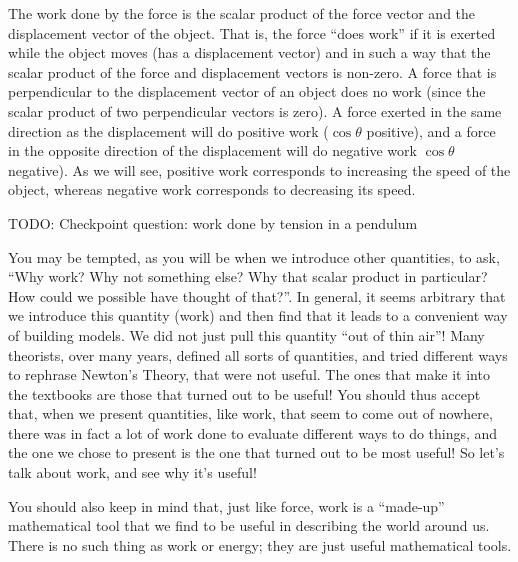 The work done by the force is the scalar product of the force vector and the displacement vector of the object. That is, the force ``does work'' if it is exerted while the object moves (has a displacement vector) and in such a way that the scalar product of the force and displacement vectors is non-zero. A force that is perpendicular to the displacement vector of an object does no work (since the scalar product of two perpendicular vectors is zero).  A force exerted in the same direction as the displacement will do positive work ($\cos\theta$ positive), and a force in the opposite direction of the displacement will do negative work $\cos\theta$ negative). As we will see, positive work corresponds to increasing the speed of the object, whereas negative work corresponds to decreasing its speed.

TODO: Checkpoint question: work done by tension in a pendulum

You may be tempted, as you will be when we introduce other quantities, to ask, ``Why work? Why not something else? Why that scalar product in particular? How could we possible have thought of that?''. In general, it seems arbitrary that we introduce this quantity (work) and then find that it leads to a convenient way of building models. We did not just pull this quantity ``out of thin air''! Many theorists, over many years, defined all sorts of quantities, and tried different ways to rephrase Newton's Theory, that were not useful. The ones that make it into the textbooks are those that turned out to be useful! You should thus accept that, when we present quantities, like work, that seem to come out of nowhere, there was in fact a lot of work done to evaluate different ways to do things, and the one we chose to present is the one that turned out to be most useful! So let's talk about work, and see why it's useful!


You should also keep in mind that, just like force, work is a ``made-up'' mathematical tool that we find to be useful in describing the world around us. There is no such thing as work or energy; they are just useful mathematical tools.


